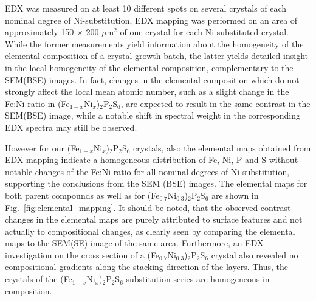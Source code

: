 \documentclass[twocolumn,superscriptaddress,prb,preprintnumbers,nobibnotes,aps]{revtex4-2}  %
\begin{document}
EDX was measured on at least 10 different spots on several crystals of each nominal degree of Ni-substitution, EDX mapping was performed on an area of approximately 150 $\times$ 200 $\mu$m$^2$ of one crystal for each Ni-substituted crystal. While the former measurements yield information about the homogeneity of the elemental composition of a crystal growth batch, the latter yields detailed insight in the local homogeneity of the elemental composition, complementary to the SEM(BSE) images. In fact, changes in the elemental composition which do not strongly affect the local mean atomic number, such as a slight change in the Fe:Ni ratio in (Fe$_{1-x}$Ni$_{x}$)$_2$P$_2$S$_6$, are expected to result in the same contrast in the SEM(BSE) image, while a notable shift in spectral weight in the corresponding EDX spectra may still be observed.

However for our (Fe$_{1-x}$Ni$_{x}$)$_2$P$_2$S$_6$ crystals, also the elemental maps obtained from EDX mapping indicate a homogeneous distribution of Fe, Ni, P and S without notable changes of the Fe:Ni ratio for all nominal degrees of Ni-substitution, supporting the conclusions from the SEM (BSE) images. The elemental maps for both parent compounds as well as for (Fe$_{0.7}$Ni$_{0.3}$)$_2$P$_2$S$_6$ are shown in Fig.~\ref{fig:elemental_mapping}. It should be noted, that the observed contrast changes in the elemental maps are purely attributed to surface features and not actually to compositional changes, as clearly seen by comparing the elemental maps to the SEM(SE) image of the same area. Furthermore, an EDX investigation on the cross section of a (Fe$_{0.7}$Ni$_{0.3}$)$_2$P$_2$S$_6$ crystal also revealed no compositional gradients along the stacking direction of the layers. Thus, the crystals of the (Fe$_{1-x}$Ni$_{x}$)$_2$P$_2$S$_6$ substitution series are homogeneous in composition.
\end{document}
